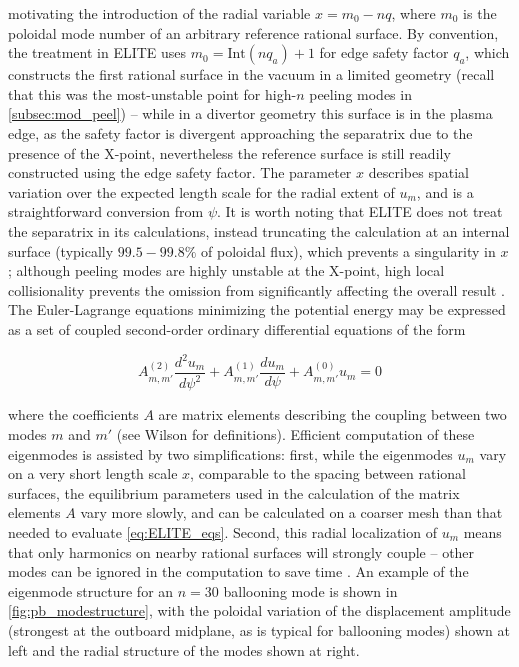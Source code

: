 \noindent motivating the introduction of the radial variable $x = m_0 - nq$, where $m_0$ is the poloidal mode number of an arbitrary reference rational surface.  By convention, the treatment in ELITE uses $m_0 = \mbox{Int}(nq_a) + 1$ for edge safety factor $q_a$, which constructs the first rational surface in the vacuum in a limited geometry (recall that this was the most-unstable point for high-$n$ peeling modes in \cref{subsec:mod_peel}) -- while in a divertor geometry this surface is in the plasma edge, as the safety factor is divergent approaching the separatrix due to the presence of the X-point, nevertheless the reference surface is still readily constructed using the edge safety factor.  The parameter $x$ describes spatial variation over the expected length scale for the radial extent of $u_m$, and is a straightforward conversion from $\psi$.  It is worth noting that ELITE does not treat the separatrix in its calculations, instead truncating the calculation at an internal surface (typically $99.5-99.8\%$ of poloidal flux), which prevents a singularity in $x$; although peeling modes are highly unstable at the X-point, high local collisionality prevents the omission from significantly affecting the overall result \cite{Snyder2009a}.  The Euler-Lagrange equations minimizing the potential energy may be expressed as a set of coupled second-order ordinary differential equations of the form \cite{Dowsett2014}

\begin{equation}\label{eq:ELITE_eqs}
 A^{(2)}_{m,m'} \frac{d^2 u_m}{d\psi^2} + A^{(1)}_{m,m'} \frac{du_m}{d\psi} + A^{(0)}_{m,m'} u_m = 0
\end{equation}

\noindent where the coefficients $A$ are matrix elements describing the coupling between two modes $m$ and $m'$ (see Wilson \etal \cite{Wilson2002} for definitions).  Efficient computation of these eigenmodes is assisted by two simplifications: first, while the eigenmodes $u_m$ vary on a very short length scale $x$, comparable to the spacing between rational surfaces, the equilibrium parameters used in the calculation of the matrix elements $A$ vary more slowly, and can be calculated on a coarser mesh than that needed to evaluate \cref{eq:ELITE_eqs}.  Second, this radial localization of $u_m$ means that only harmonics on nearby rational surfaces will strongly couple -- other modes can be ignored in the computation to save time \cite{Wilson2002}.  An example of the eigenmode structure for an $n=30$ ballooning mode is shown in \cref{fig:pb_modestructure}, with the poloidal variation of the displacement amplitude (strongest at the outboard midplane, as is typical for ballooning modes) shown at left and the radial structure of the modes shown at right.

